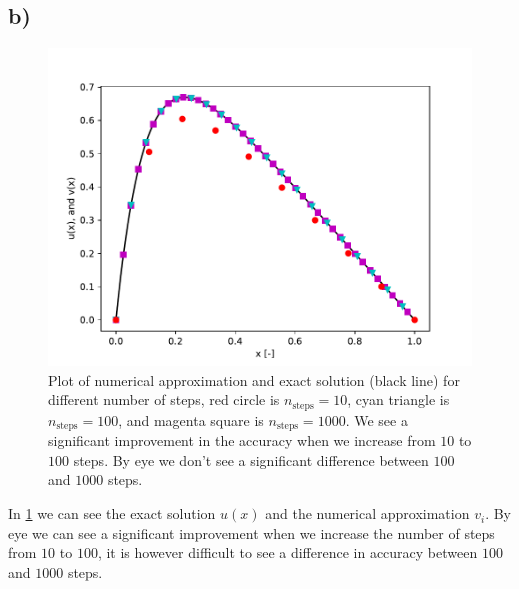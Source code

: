 \documentclass[a4paper,10pt,english]{article}
\begin{document}
			\subsection{b)}
			\begin{figure}[H]
				\centering
				\includegraphics[width=1.0\linewidth]{figures/plot_7.pdf}
				\caption{Plot of numerical approximation and exact solution (black line) for different number of steps, red circle is $n_{\text{steps} } = 10$, cyan triangle is $n_{\text{steps} } = 100$, and magenta
					square is $n_{\text{steps} } = 1000$. We see a significant improvement in the accuracy when we increase from $10$ to $100$ steps. By eye we don't see a significant difference between $100$ and $1000$ steps.}
				\label{fig_plot7}
			\end{figure}
			
			In \ref{fig_plot7} we can see the exact solution $u(x)$ and the numerical approximation $v_i$. By eye we can see a significant improvement when we increase the number of steps from $10$ to $100$, it is however
			difficult to see a difference in accuracy between $100$ and $1000$ steps.
			
			
			\section{} %
\end{document}
